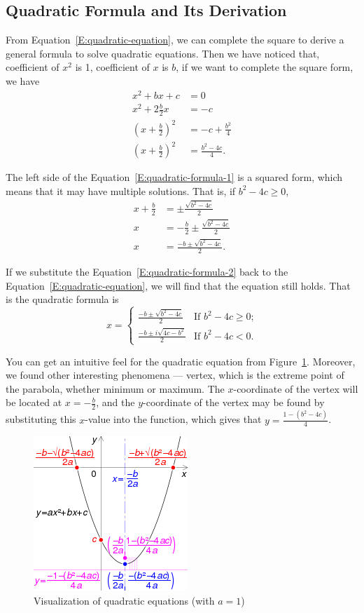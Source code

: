\subsection{Quadratic Formula and Its Derivation}
From Equation~\eqref{E:quadratic-equation}, we can complete the square to derive a general formula to solve quadratic equations. Then we have noticed that, coefficient of $x^2$ is 1, coefficient of $x$ is $b$, if we want to complete the square form, we have
\begin{equation}\label{E:quadratic-formula-1}
    \begin{aligned}
        x^2 + bx + c &= 0 \\
        x^2 + 2\frac{b}{2}x &= -c \\
        \left(x+\frac{b}{2}\right)^2 &= -c + \frac{b^2}{4} \\
        \left(x+\frac{b}{2}\right)^2 &= \frac{b^2-4c}{4}.
    \end{aligned}
\end{equation}

The left side of the Equation~\eqref{E:quadratic-formula-1} is a squared form, which means that it may have multiple solutions. That is, if $b^2-4c\geq 0$,
\begin{equation}\label{E:quadratic-formula-2}
    \begin{aligned}
        x + \frac{b}{2} &= \pm \frac{\sqrt{b^2-4c}}{2} \\
        x &= -\frac{b}{2} \pm \frac{\sqrt{b^2-4c}}{2} \\
        x &= \frac{-b\pm\sqrt{b^2-4c}}{2}.
    \end{aligned}
\end{equation}

If we substitute the Equation~\eqref{E:quadratic-formula-2} back to the Equation~\eqref{E:quadratic-equation}, we will find that the equation still holds. That is the quadratic formula is
\begin{equation}\label{E:quadratic-formula}
    x = \begin{cases}
        \frac{-b\pm\sqrt{b^2-4c}}{2} & \text{If $b^2-4c\geq 0$;} \\
        \frac{-b\pm i\sqrt{4c-b^2}}{2} & \text{If $b^2-4c<0$.}
    \end{cases}
\end{equation}

You can get an intuitive feel for the quadratic equation from Figure~\ref{F:quadratic-formula}. Moreover, we found other interesting phenomena --- vertex, which is the extreme point of the parabola, whether minimum or maximum. The $x$-coordinate of the vertex will be located at $x=-\tfrac{b}{2}$, and the $y$-coordinate of the vertex may be found by substituting this $x$-value into the function, which gives that $y=\tfrac{1-(b^2-4c)}{4}$.

\begin{figure}
    \centering
    \includegraphics[width=.35\textwidth]{figures/quadratic_equation-2.png}
    \caption{Visualization of quadratic equations (with $a=1$)}\label{F:quadratic-formula}
\end{figure}
